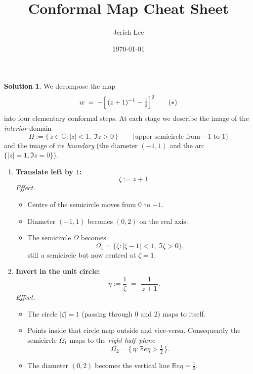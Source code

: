 \documentclass[12pt]{article}
\title{Conformal Map Cheat Sheet}
\author{Jerich Lee}
\date{\today}
\theoremstyle{definition} %
\newtheorem{solution}{Solution}
\theoremstyle{plain} %
\begin{document}
\maketitle
\begin{solution}
  We decompose the map
  \[
     w \;=\; -\Bigl[\,(z+1)^{-1}-\tfrac12\Bigr]^{2}
  \tag{$\ast$}\label{eq:fullmap}
  \]
  into four elementary conformal steps.  At each stage we describe the
  image of the \emph{interior} domain
  \[
     \Omega := \{\,z\in\mathbb{C} : |z|<1,\;\Im z>0\,\}
     \qquad
     \bigl(\text{upper semicircle from $-1$ to $1$}\bigr)
  \]
  and the image of its \emph{boundary} (the diameter $(-1,1)$ and the arc
  $\{|z|=1,\Im z=0\}$).
  
  \medskip
  \begin{enumerate}[label=\textbf{Step~\arabic*.},wide,labelwidth=!,labelindent=0pt]
  
  \item \textbf{Translate left by $1$:}
        \[
           \zeta := z+1 .
        \]
        \emph{Effect.}
        \begin{itemize}
           \item Centre of the semicircle moves from $0$ to $-1$.
           \item Diameter $(-1,1)$ becomes $(0,2)$ on the real axis.
           \item The semicircle $\Omega$ becomes
                 \[
                   \Omega_1
                   = \bigl\{\zeta : |\zeta-1|<1,\;\Im\zeta>0\bigr\},
                 \]
                 still a semicircle but now centred at $\zeta=1$.
        \end{itemize}
  
  \item \textbf{Invert in the unit circle:}
        \[
           \eta := \frac{1}{\zeta}\;=\;\frac{1}{\,z+1\,}.
        \]
        \emph{Effect.}
        \begin{itemize}
           \item The circle $|\zeta|=1$ (passing through $0$ and $2$)
                 maps to itself.
           \item Points inside that circle map outside and vice‑versa.
                 Consequently the semicircle $\Omega_1$ maps to the
                 \emph{right half–plane}
                 \[
                    \Omega_2 = \{\,\eta : \mathbb{R}e\eta> \tfrac12\,\}.
                 \]
           \item The diameter $(0,2)$ becomes the vertical line
                 $\mathbb{R}e\eta=\tfrac12$.
        \end{itemize}
  

\end{enumerate}
\end{solution}
\end{document}

